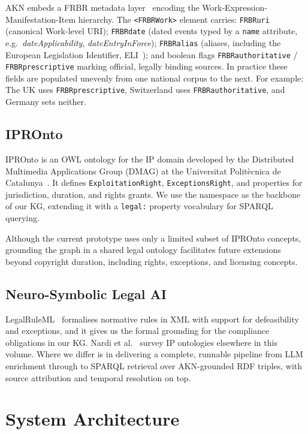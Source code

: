 \documentclass[12pt,a4paper]{article}
\begin{document}
AKN embeds a FRBR metadata layer~\cite{ifla1998} encoding the
Work-Expression-Manifestation-Item hierarchy. The \texttt{<FRBRWork>}
element carries: \texttt{FRBRuri} (canonical Work-level URI);
\texttt{FRBRdate} (dated events typed by a \texttt{name} attribute, e.g.\
\emph{dateApplicability}, \emph{dateEntryInForce}); \texttt{FRBRalias}
(aliases, including the European Legislation Identifier,
ELI~\cite{eli2012}); and boolean flags \texttt{FRBRauthoritative} /
\texttt{FRBRprescriptive} marking official, legally binding sources.
In practice these fields are populated unevenly from one national corpus
to the next. For example: The UK uses \texttt{FRBRprescriptive}, Switzerland uses
\texttt{FRBRauthoritative}, and Germany sets neither. 

\subsection{IPROnto}

IPROnto is an OWL ontology for the IP domain developed by the Distributed
Multimedia Applications Group (DMAG) at the Universitat Polit\`{e}cnica
de Catalunya~\cite{delgado2003}. It defines \texttt{ExploitationRight},
\texttt{ExceptionsRight}, and properties for jurisdiction, duration, and
rights grants. We use the namespace as the backbone of our KG,
extending it with a \texttt{legal:} property vocabulary for SPARQL querying. 

Although the current prototype uses only a limited subset of IPROnto concepts, grounding the graph in a shared legal ontology facilitates future extensions beyond copyright duration, including rights, exceptions, and licensing concepts.

\subsection{Neuro-Symbolic Legal AI}

LegalRuleML~\cite{palmirani2011lrml} formalises normative rules in XML
with support for defeasibility and exceptions, and it gives us the formal
grounding for the compliance obligations in our KG. Nardi et
al.~\cite{nardi2026} survey IP ontologies elsewhere in this volume. Where
we differ is in delivering a complete, runnable pipeline from LLM
enrichment through to SPARQL retrieval over AKN-grounded RDF triples,
with source attribution and temporal resolution on top.

\section{System Architecture}
\end{document}

